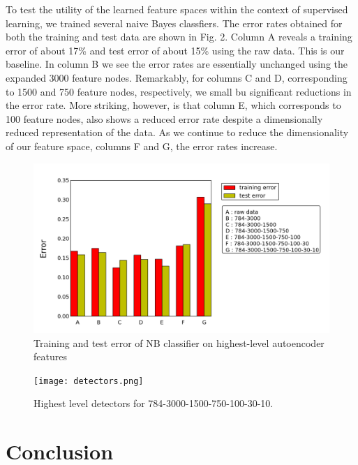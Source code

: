\documentclass{article}
\begin{document}
To test the utility of the learned feature spaces within the context of supervised learning, we trained several naive Bayes classfiers. The error rates obtained for both the training and test data are shown in Fig. 2. Column A reveals a training error of about 17\% and test error of about 15\% using the raw data. This is our baseline. In column B we see the error rates are essentially unchanged using the expanded 3000 feature nodes. Remarkably, for columns C and D, corresponding to 1500 and 750 feature nodes, respectively, we small bu significant reductions in the error rate. More striking, however, is that column E, which corresponds to 100 feature nodes, also shows a reduced error rate despite a dimensionally reduced representation of the data. As we continue to reduce the dimensionality of our feature space, columns F and G, the error rates increase.

\begin{figure}[htbp!]
    \centering
    \includegraphics[width=\textwidth]{trainingAndTestError.png}
    \caption{Training and test error of NB classifier on highest-level autoencoder features}
    \label{fig:error}
\end{figure}%

\begin{figure}[htbp!]
    \centering
    \texttt{[image: detectors.png]}
    \caption{Highest level detectors for 784-3000-1500-750-100-30-10.}
    \label{fig:detectors}
\end{figure}%

\section{Conclusion}\label{sec:conclusion}

\nocite{*}
{}

\end{document}
